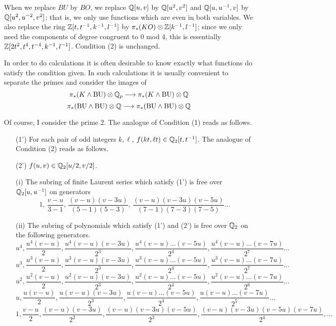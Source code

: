\documentclass[../main]{subfiles}
\begin{document}
\begin{remark*}
When we replace ${BU}$ by ${BO}$, we replace $\mathbb{Q}[u,v]$ by $\mathbb{Q}[u^2,v^2]$ and $\mathbb{Q}[u,u^{-1},v]$ by $\mathbb{Q}[u^2,u^{-2},v^2]$; that is, we only use functions which are even in both variables. We also replace the ring $\mathbb{Z}[t,t^{-1},k^{-1},l^{-1}]$ by $\pi_*(KO)\otimes\mathbb{Z}[k^{-1},l^{-1}]$; since we only need the components of degree congruent to 0 mod 4, this is essentially
$\mathbb{Z}[2t^2,t^4,t^{-4},k^{-1},l^{-1}]$. Condition (2) is unchanged.

In order to do calculations it is often desirable to know exactly what functions do satisfy the condition given. In such calculations it is usually convenient to separate the primes and consider the images of $$\pi_\ast(K \wedge \mathrm{BU}) \otimes \mathbb{Q}_p \overset{}{\longrightarrow} \pi_\ast(K \wedge \mathrm{BU}) \otimes \mathbb{Q}$$ $$\pi_\ast(\mathrm{BU} \wedge \mathrm{BU}) \otimes \mathbb{Q} \overset{}{\longrightarrow} \pi_\ast(\mathrm{BU} \wedge \mathrm{BU}) \otimes \mathbb{Q}$$
\end{remark*}

Of course, I consider the prime $2$. The analogue of Condition (1) reads as follows.

\begin{enumerate}
    \item[(1')] For each pair of odd integers $k, \ell$, $f(kt, \ell t) \in \mathbb{Q}_2[t, t^{-1}]$.
    The analogue of Condition (2) reads as follows.
    \item[(2')] $f(u, v) \in \mathbb{Q}_2[u/2, v/2]$.
\end{enumerate}

\begin{proposition}
\label{prop:p3c17.6} 
\begin{enumerate}
    \item[(i)] The subring of finite Laurent series which satisfy (1') is free over $\mathbb{Q}_2[u, u^{-1}]$ on generators $$1, \, \frac {v - u} {3 - 1}, \, \frac {(v - u)(v - 3u)} {(5 - 1)(5-3)}, \, \frac {(v - u)(v - 3u)(v - 5u)} {(7 - 1)(7 - 3)(7 - 5)} \ldots$$
    \item[(ii)] The subring of polynomials which satisfy (1') and (2') is free over $\mathbb{Q}_2$ on the following generators. 
    $$u^4, \frac {u^4(v - u)} 2, \frac {u^4(v - u)(v - 3u)} {2^3}, \frac {u^4(v - u)\ldots(v - 5u)} {2^4}, \frac {u^4(v - u) \ldots (v - 7u)} {2^7} \ldots$$ 
    $$u^3, \frac {u^3(v - u)} 2, \frac {u^3(v - u)(v - 3u)} {2^3}, \frac {u^3(v - u)\ldots(v - 5u)} {2^4}, \frac {u^3(v - u) \ldots (v - 7u)} {2^7} \ldots$$
    $$u^2, \frac {u^2(v - u)} 2, \frac {u^2(v - u)(v - 3u)} {2^3}, \frac {u^2(v - u)\ldots(v - 5u)} {2^4}, \frac {u^2(v - u) \ldots (v - 7u)} {2^6} \ldots$$
    $$u, \frac {u(v - u)} 2, \frac {u(v - u)(v - 3u)} {2^3}, \frac {u(v - u)\ldots(v - 5u)} {2^4}, \frac {u(v - u) \ldots (v - 7u)} {2^5} \ldots$$
    $$1, \frac {v - u} 2, \frac {(v - u)(v - 3u)} {2^2}, \frac {(v - u)(v - 3u)(v - 5u)} {2^3}, \frac {(v - u)(v - 3u)(v - 5u)(v - 7u)} {2^4}, \ldots$$
\end{enumerate}
\end{proposition}
\end{document}
